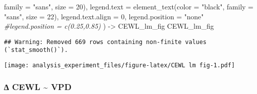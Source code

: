 \documentclass[
]{article}
\newenvironment{Shaded}{\begin{snugshade}}{\end{snugshade}}
\newcommand{\AttributeTok}[1]{\textcolor[rgb]{0.77,0.63,0.00}{#1}}
\newcommand{\CommentTok}[1]{\textcolor[rgb]{0.56,0.35,0.01}{\textit{#1}}}
\newcommand{\DecValTok}[1]{\textcolor[rgb]{0.00,0.00,0.81}{#1}}
\newcommand{\FunctionTok}[1]{\textcolor[rgb]{0.00,0.00,0.00}{#1}}
\newcommand{\NormalTok}[1]{#1}
\newcommand{\OtherTok}[1]{\textcolor[rgb]{0.56,0.35,0.01}{#1}}
\newcommand{\StringTok}[1]{\textcolor[rgb]{0.31,0.60,0.02}{#1}}
\begin{document}
\begin{Shaded}
\begin{Highlighting}[]
                                 \AttributeTok{family =} \StringTok{"sans"}\NormalTok{, }
                                 \AttributeTok{size =} \DecValTok{20}\NormalTok{),}
        \AttributeTok{legend.text =} \FunctionTok{element\_text}\NormalTok{(}\AttributeTok{color =} \StringTok{"black"}\NormalTok{, }
                                 \AttributeTok{family =} \StringTok{"sans"}\NormalTok{, }
                                 \AttributeTok{size =} \DecValTok{22}\NormalTok{),}
        \AttributeTok{legend.text.align =} \DecValTok{0}\NormalTok{,}
        \AttributeTok{legend.position =} \StringTok{"none"}
        \CommentTok{\#legend.position = c(0.25,0.85)}
\NormalTok{        ) }\OtherTok{{-}\textgreater{}}\NormalTok{ CEWL\_lm\_fig}
\NormalTok{CEWL\_lm\_fig}
\end{Highlighting}
\end{Shaded}

\begin{verbatim}
## Warning: Removed 669 rows containing non-finite values (`stat_smooth()`).
\end{verbatim}

\texttt{[image: analysis\_experiment\_files/figure-latex/CEWL lm fig-1.pdf]}

\hypertarget{cewl-vpd-1}{%
\subsubsection{∆ CEWL \textasciitilde{} VPD}\label{cewl-vpd-1}}
\end{document}
